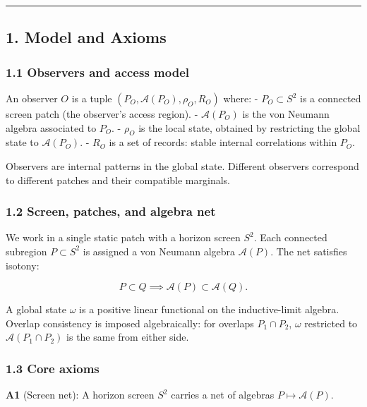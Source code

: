 \documentclass[
]{article}
\begin{document}
\begin{center}\rule{0.5\linewidth}{0.5pt}\end{center}

\subsection{1. Model and Axioms}\label{model-and-axioms}

\subsubsection{1.1 Observers and access
model}\label{observers-and-access-model}

An observer \(O\) is a tuple \((P_O, \mathcal{A}(P_O), \rho_O, R_O)\)
where: - \(P_O \subset S^2\) is a connected screen patch (the observer's
access region). - \(\mathcal{A}(P_O)\) is the von Neumann algebra
associated to \(P_O\). - \(\rho_O\) is the local state, obtained by
restricting the global state to \(\mathcal{A}(P_O)\). - \(R_O\) is a set
of records: stable internal correlations within \(P_O\).

Observers are internal patterns in the global state. Different observers
correspond to different patches and their compatible marginals.

\subsubsection{1.2 Screen, patches, and algebra
net}\label{screen-patches-and-algebra-net}

We work in a single static patch with a horizon screen \(S^2\). Each
connected subregion \(P \subset S^2\) is assigned a von Neumann algebra
\(\mathcal{A}(P)\). The net satisfies isotony:

\[
P \subset Q \implies \mathcal{A}(P) \subset \mathcal{A}(Q).
\]

A global state \(\omega\) is a positive linear functional on the
inductive-limit algebra. Overlap consistency is imposed algebraically:
for overlaps \(P_1 \cap P_2\), \(\omega\) restricted to
\(\mathcal{A}(P_1 \cap P_2)\) is the same from either side.

\subsubsection{1.3 Core axioms}\label{core-axioms}

\textbf{A1} (Screen net): A horizon screen \(S^2\) carries a net of
algebras \(P \mapsto \mathcal{A}(P)\).
\end{document}
